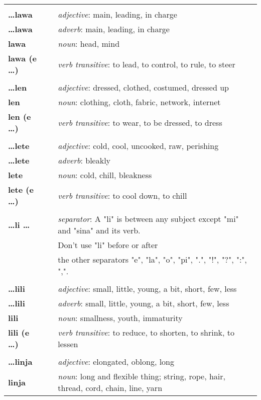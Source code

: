 \begin{supertabular}{p{2,5cm}|ll}
 && \\ %
\textbf{\dots lawa} && \textit{adjective}: main, leading, in charge \\ 
\textbf{\dots lawa} && \textit{adverb}: main, leading, in charge \\ 
\textbf{lawa} && \textit{noun}: head, mind \\ 
\textbf{lawa (e \dots)} && \textit{verb transitive}: to lead, to control, to rule, to steer \\ 
 && \\ %
\textbf{\dots len} && \textit{adjective}: dressed, clothed, costumed, dressed up \\ 
\textbf{len} && \textit{noun}: clothing, cloth, fabric, network, internet \\ 
\textbf{len (e \dots)} && \textit{verb transitive}: to wear, to be dressed, to dress \\ 
 && \\ %
\textbf{\dots lete} && \textit{adjective}: cold, cool, uncooked, raw, perishing \\ 
\textbf{\dots lete} && \textit{adverb}: bleakly \\ 
\textbf{lete} && \textit{noun}: cold, chill, bleakness \\ 
\textbf{lete (e \dots)} && \textit{verb transitive}: to cool down, to chill \\ 
 && \\ %
\textbf{\dots li \dots} && \textit{separator}: A "li" is between any subject except "mi" and "sina" and its verb. \\ && Don't use "li" before or after \\ && the other separators "e", "la", "o", "pi", ".", "!", "?", ":", ",". \\ 
 && \\ %
\textbf{\dots lili} && \textit{adjective}: small, little, young, a bit, short, few, less \\ 
\textbf{\dots lili} && \textit{adverb}: small, little, young, a bit, short, few, less \\ 
\textbf{lili} && \textit{noun}: smallness, youth, immaturity \\ 
\textbf{lili (e \dots)} && \textit{verb transitive}: to reduce, to shorten, to shrink, to lessen \\ 
 && \\ %
\textbf{\dots linja} && \textit{adjective}: elongated, oblong, long \\ 
\textbf{linja} && \textit{noun}: long and flexible thing; string, rope, hair, thread, cord, chain, line, yarn \\ 

\end{supertabular}
